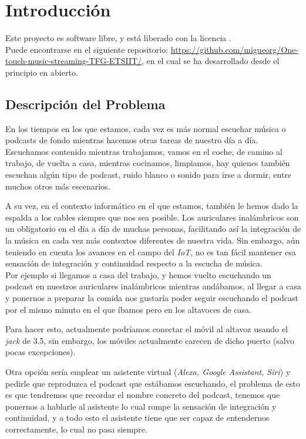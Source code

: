 \chapter{Introducción}

Este proyecto es software libre, y está liberado con la licencia \cite{gplv3}.\\

Puede encontrarse en el siguiente repositorio:
\url{https://github.com/migueorg/One-touch-music-streaming-TFG-ETSIIT/}, en el
cual se ha desarrollado desde el principio en abierto.

\section{Descripción del Problema}
En los tiempos en los que estamos, cada vez es más normal escuchar música o
podcasts de fondo mientras hacemos otras tareas de nuestro día a día. Escuchamos
contenido mientras trabajamos, vamos en el coche, de camino al trabajo, de
vuelta a casa, mientras cocinamos, limpiamos, hay quienes también escuchan algún
tipo de podcast, ruido blanco o sonido para irse a dormir, entre muchos otros
más escenarios. 

A su vez, en el contexto informático en el que estamos,
también le hemos dado la espalda a los cables siempre que nos sea posible. Los
auriculares inalámbricos son un obligatorio en el día a día de muchas personas,
facilitando así la integración de la música en cada vez más contextos diferentes
de nuestra vida. Sin embargo, aún teniendo en cuenta los avances en el campo del
\emph{IoT}, no es tan fácil mantener esa sensación de integración y continuidad
respecto a la escucha de música.\\

Por ejemplo si llegamos a casa del trabajo, y hemos vuelto escuchando un podcast
en nuestros auriculares inalámbricos mientras andábamos, al llegar a casa y
ponernos a preparar la comida nos gustaría poder seguir escuchando el podcast
por el mismo minuto en el que íbamos pero en los altavoces de casa. 

Para hacer esto, actualmente podríamos conectar el móvil al altavoz usando el
\emph{jack} de 3.5, sin embargo, los móviles actualmente carecen de dicho puerto
(salvo pocas excepciones). 

Otra opción sería emplear un asistente virtual (\emph{Alexa, Google Assistant,
Siri}) y pedirle que reproduzca el podcast que estábamos escuchando, el problema
de esto es que tendremos que recordar el nombre concreto del podcast, tenemos
que ponernos a hablarle al asistente lo cual rompe la sensación de integración y
continuidad, y a todo esto el asistente tiene que ser capaz de entendernos
correctamente, lo cual no pasa siempre. 

